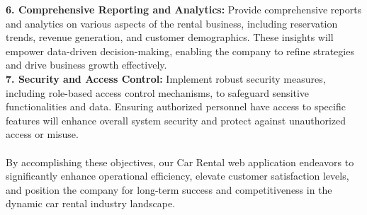 \textbf{6. Comprehensive Reporting and Analytics:} Provide comprehensive reports and analytics on various aspects of the rental business, including reservation trends, revenue generation, and customer demographics. These insights will empower data-driven decision-making, enabling the company to refine strategies and drive business growth effectively.\\

\textbf{7. Security and Access Control: }Implement robust security measures, including role-based access control mechanisms, to safeguard sensitive functionalities and data. Ensuring authorized personnel have access to specific features will enhance overall system security and protect against unauthorized access or misuse.\\
\\
By accomplishing these objectives, our Car Rental web application endeavors to significantly enhance operational efficiency, elevate customer satisfaction levels, and position the company for long-term success and competitiveness in the dynamic car rental industry landscape.\newpage
